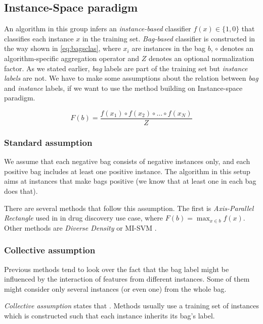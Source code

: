 \subsection{Instance-Space paradigm}
An algorithm in this group infers an \emph{instance-based} classifier $f(x) \in \{1,0\}$ that classifies each instance $x$ in the training set. \emph{Bag-based} classifier is constructed in the way shown in \eqref{eq:bagsclas}, where $x_i$ are instances in the bag $b$, $\circ$ denotes an algorithm-specific aggregation operator and $Z$ denotes an optional normalization factor. As we stated earlier, \emph{bag} labels are part of the training set but \emph{instance labels} are not. We have to make some assumptions about the relation between \emph{bag} and \emph{instance} labels, if we want to use the method building on Instance-space paradigm.

\begin{equation} \label{eq:bagsclas}
    F(b)=\frac{f(x_1)\circ f(x_2)\circ\dots\circ f(x_N)}{Z}
\end{equation}

\subsubsection{Standard assumption}
We assume that each negative bag consists of negative instances only, and each positive bag includes at least one positive instance. The algorithm in this setup aims at instances that make bags positive (we know that at least one in each bag does that).

There are several methods that follow this assumption. The first is \emph{Axis-Parallel Rectangle} used in \cite{Dietterich1997} in drug discovery use case, where $F(b)=\max_{x\in b}f(x)$. Other methods are \emph{Diverse Density} \cite{Maron1998} or MI-SVM \cite{Andrews2003}.

\subsubsection{Collective assumption}
Previous methods tend to look over the fact that the bag label might be influenced by the interaction of features from different instances. Some of them might consider only several instances (or even one) from the whole bag.

\emph{Collective assumption} states that  \cite{Xu2003}. Methods usually use a training set of instances which is constructed such that each instance inherits its bag's label.


